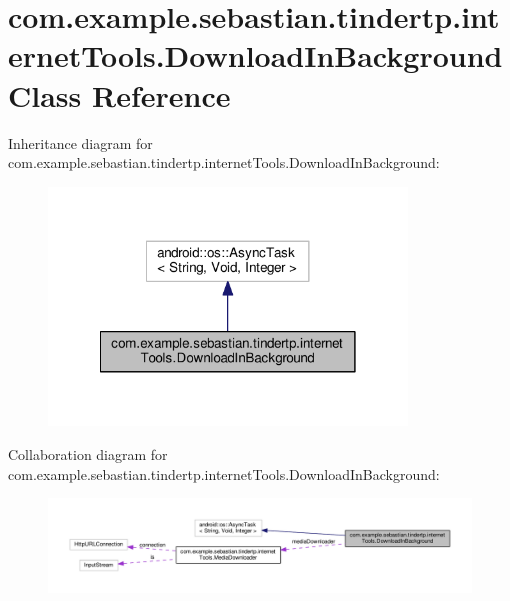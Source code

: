 \hypertarget{classcom_1_1example_1_1sebastian_1_1tindertp_1_1internetTools_1_1DownloadInBackground}{}\section{com.\+example.\+sebastian.\+tindertp.\+internet\+Tools.\+Download\+In\+Background Class Reference}
\label{classcom_1_1example_1_1sebastian_1_1tindertp_1_1internetTools_1_1DownloadInBackground}


Inheritance diagram for com.\+example.\+sebastian.\+tindertp.\+internet\+Tools.\+Download\+In\+Background\+:\nopagebreak
\begin{figure}[H]
\begin{center}
\leavevmode
\includegraphics[width=270pt]{classcom_1_1example_1_1sebastian_1_1tindertp_1_1internetTools_1_1DownloadInBackground__inherit__graph}
\end{center}
\end{figure}


Collaboration diagram for com.\+example.\+sebastian.\+tindertp.\+internet\+Tools.\+Download\+In\+Background\+:\nopagebreak
\begin{figure}[H]
\begin{center}
\leavevmode
\includegraphics[width=350pt]{classcom_1_1example_1_1sebastian_1_1tindertp_1_1internetTools_1_1DownloadInBackground__coll__graph}
\end{center}
\end{figure}
